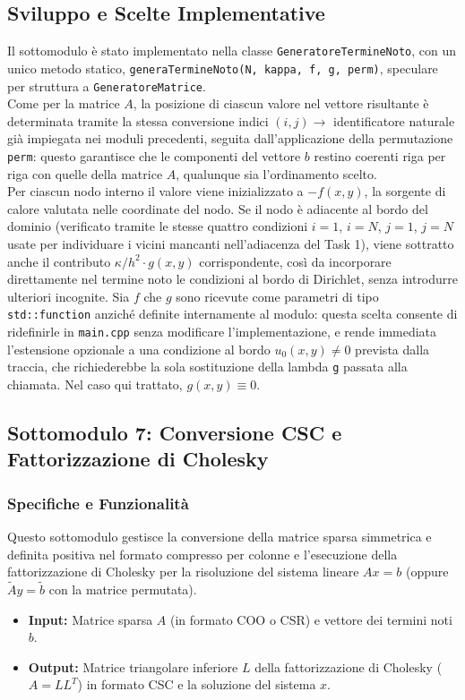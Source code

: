 \documentclass[twocolumn]{article}
\begin{document}
\subsection{Sviluppo e Scelte Implementative}
Il sottomodulo è stato implementato nella classe \texttt{GeneratoreTermineNoto},
con un unico metodo statico, \texttt{generaTermineNoto(N, kappa, f, g, perm)},
speculare per struttura a \texttt{GeneratoreMatrice}.\\

Come per la matrice $A$, la posizione di ciascun valore nel vettore risultante
è determinata tramite la stessa conversione indici $(i,j) \to$ identificatore
naturale già impiegata nei moduli precedenti, seguita dall'applicazione della
permutazione \texttt{perm}: questo garantisce che le componenti del vettore
$b$ restino coerenti riga per riga con quelle della matrice $A$, qualunque sia
l'ordinamento scelto.\\

Per ciascun nodo interno il valore viene inizializzato a $-f(x,y)$, la
sorgente di calore valutata nelle coordinate del nodo. Se il nodo è adiacente
al bordo del dominio (verificato tramite le stesse quattro condizioni $i=1$,
$i=N$, $j=1$, $j=N$ usate per individuare i vicini mancanti nell'adiacenza del
Task 1), viene sottratto anche il contributo $\kappa/h^2 \cdot g(x,y)$
corrispondente, così da incorporare direttamente nel termine noto le
condizioni al bordo di Dirichlet, senza introdurre ulteriori incognite. Sia
$f$ che $g$ sono ricevute come parametri di tipo \texttt{std::function}
anziché definite internamente al modulo: questa scelta consente di
ridefinirle in \texttt{main.cpp} senza modificare l'implementazione, e rende
immediata l'estensione opzionale a una condizione al bordo $u_0(x,y) \neq 0$
prevista dalla traccia, che richiederebbe la sola sostituzione della lambda
\texttt{g} passata alla chiamata. Nel caso qui trattato, $g(x,y) \equiv 0$.


\subsection{Sottomodulo 7: Conversione CSC e Fattorizzazione di Cholesky}

\subsubsection{Specifiche e Funzionalit\`a}
Questo sottomodulo gestisce la conversione della matrice sparsa simmetrica e definita positiva nel formato compresso per colonne e l'esecuzione della fattorizzazione di Cholesky per la risoluzione del sistema lineare $Ax = b$ (oppure $\tilde{A}y = \tilde{b}$ con la matrice permutata).
\begin{itemize}
    \item \textbf{Input:} Matrice sparsa $A$ (in formato COO o CSR) e vettore dei termini noti $b$.
    \item \textbf{Output:} Matrice triangolare inferiore $L$ della fattorizzazione di Cholesky ($A = L L^T$) in formato CSC e la soluzione del sistema $x$.
\end{itemize}
\end{document}
